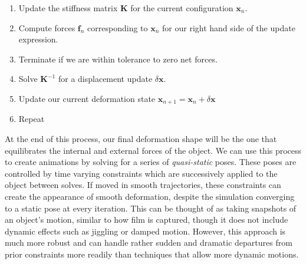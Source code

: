 \begin{enumerate}
  \item Update the stiffness matrix $\mathbf K$ for the current
    configuration $\mathbf x_n$.
  \item Compute forces $\mathbf f_n$ corresponding to $\mathbf x_n$
    for our right hand side of the update expression.
  \item Terminate if we are within tolerance to zero net forces.
  \item Solve $\mathbf K^{-1}$ for a displacement update $\delta \mathbf x$.
  \item Update our current deformation state $\mathbf x_{n+1} = \mathbf x_n +
    \delta \mathbf x$
  \item Repeat
\end{enumerate}

At the end of this process, our final deformation shape will be the
one that equilibrates the internal and external forces of the
object. We can use this process to create animations by solving for a
series of \textit{quasi-static} poses. These poses are controlled by
time varying constraints which are successively applied to the object
between solves. If moved in smooth trajectories, these constraints can
create the appearance of smooth deformation, despite the simulation
converging to a static pose at every iteration. This can be thought of
as taking snapshots of an object's motion, similar to how film is
captured, though it does not include dynamic effects such as jiggling
or damped motion. However, this approach is much more robust and can
handle rather sudden and dramatic departures from prior constraints
more readily than techniques that allow more dynamic motions.
  
